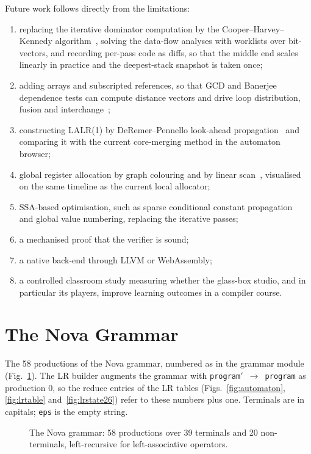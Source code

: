 \documentclass[conference]{IEEEtran}
\newcommand{\code}[1]{\texttt{#1}}
\begin{document}
Future work follows directly from the limitations:
\begin{enumerate}
\item replacing the iterative dominator computation by the Cooper--Harvey--Kennedy algorithm~\cite{cooper2001}, solving the data-flow analyses with worklists over bit-vectors, and recording per-pass code as diffs, so that the middle end scales linearly in practice and the deepest-stack snapshot is taken once;
\item adding arrays and subscripted references, so that GCD and Banerjee dependence tests can compute distance vectors and drive loop distribution, fusion and interchange~\cite{kennedy1993,allen2001};
\item constructing LALR(1) by DeRemer--Pennello look-ahead propagation~\cite{deremer1982} and comparing it with the current core-merging method in the automaton browser;
\item global register allocation by graph colouring and by linear scan~\cite{chaitin1982,poletto1999}, visualised on the same timeline as the current local allocator;
\item SSA-based optimisation, such as sparse conditional constant propagation~\cite{wegman1991} and global value numbering, replacing the iterative passes;
\item a mechanised proof that the verifier is sound;
\item a native back-end through LLVM or WebAssembly;
\item a controlled classroom study measuring whether the glass-box studio, and in particular its players, improve learning outcomes in a compiler course.
\end{enumerate}

\appendices
\section{The Nova Grammar}
\label{app:grammar}
The 58 productions of the Nova grammar, numbered as in the grammar module (Fig.~\ref{fig:grammarlisting}). The LR builder augments the grammar with \code{program$'$ $\to$ program} as production 0, so the reduce entries of the LR tables (Figs.~\ref{fig:automaton}, \ref{fig:lrtable} and~\ref{fig:lrstate26}) refer to these numbers plus one. Terminals are in capitals; \code{eps} is the empty string.

\begin{figure}[!tp]
\begin{minipage}[t]{0.495\textwidth}

\end{minipage}\hfill
\begin{minipage}[t]{0.495\textwidth}

\end{minipage}
\caption{The Nova grammar: 58 productions over 39 terminals and 20 non-terminals, left-recursive for left-associative operators.}
\label{fig:grammarlisting}
\end{figure}
\end{document}
